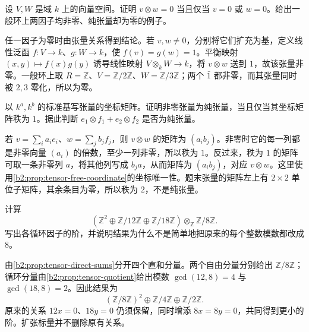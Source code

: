 \begin{exercise}\label{b2:ex:06-nonzero-pure}
	设 \(V,W\) 是域 \(k\) 上的向量空间。证明 \(v\otimes w=0\) 当且仅当 \(v=0\) 或 \(w=0\)。给出一般环上两因子均非零、纯张量却为零的例子。
\end{exercise}
\begin{solution}
	任一因子为零时由张量关系得到结论。若 \(v,w\ne0\)，分别将它们扩充为基，定义线性泛函 \(f:V\to k\)、\(g:W\to k\)，使 \(f(v)=g(w)=1\)。平衡映射 \((x,y)\mapsto f(x)g(y)\) 诱导线性映射 \(V\otimes_kW\to k\)，将 \(v\otimes w\) 送到 \(1\)，故该张量非零。一般环上取 \(R=\mathbb Z\)、\(V=\mathbb Z/2\mathbb Z\)、\(W=\mathbb Z/3\mathbb Z\)；两个 \(\bar1\) 都非零，而其张量同时被 \(2,3\) 零化，所以为零。
\end{solution}

\begin{exercise}\label{b2:ex:06-matrix-rank-one}
	以 \(k^a,k^b\) 的标准基写张量的坐标矩阵。证明非零张量为纯张量，当且仅当其坐标矩阵秩为 \(1\)。据此判断 \(e_1\otimes f_1+e_2\otimes f_2\) 是否为纯张量。
\end{exercise}
\begin{solution}
	若 \(v=\sum_i a_ie_i\)、\(w=\sum_j b_jf_j\)，则 \(v\otimes w\) 的矩阵为 \((a_ib_j)\)。非零时它的每一列都是非零向量 \((a_i)\) 的倍数，至少一列非零，所以秩为 \(1\)。反过来，秩为 \(1\) 的矩阵可取一条非零列 \(a\)，将其他列写成 \(b_j a\)，从而矩阵为 \((a_i b_j)\)，对应 \(v\otimes w\)。这里使用\cref{b2:prop:tensor-free-coordinate}的坐标唯一性。题末张量的矩阵左上有 \(2\times2\) 单位子矩阵，其余条目为零，所以秩为 \(2\)，不是纯张量。
\end{solution}

\begin{exercise}\label{b2:ex:06-direct-sum}
	计算
	\[
		\left(\mathbb Z^2\oplus\mathbb Z/12\mathbb Z\oplus\mathbb Z/18\mathbb Z\right) \otimes_{\mathbb Z}\mathbb Z/8\mathbb Z.
	\]
	写出各循环因子的阶，并说明结果为什么不是简单地把原来的每个整数模数都改成 \(8\)。
\end{exercise}
\begin{solution}
	由\cref{b2:prop:tensor-direct-sums}分开四个直和分量。两个自由分量分别给出 \(\mathbb Z/8\mathbb Z\)；循环分量由\cref{b2:prop:tensor-quotient}给出模数 \(\gcd(12,8)=4\) 与 \(\gcd(18,8)=2\)。因此结果为
	\[
		(\mathbb Z/8\mathbb Z)^2\oplus\mathbb Z/4\mathbb Z\oplus\mathbb Z/2\mathbb Z.
	\]
	原来的关系 \(12x=0\)、\(18y=0\) 仍须保留，同时增添 \(8x=8y=0\)，共同得到更小的阶。扩张标量并不删除原有关系。
\end{solution}

